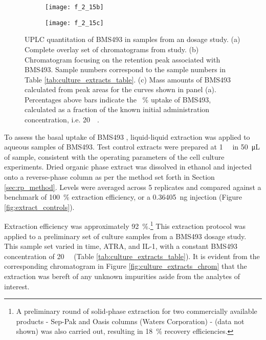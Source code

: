 \begin{refsection}
\begin{figure}[h!]
    \begin{subfigure}[b]{0.45\textwidth}
        \texttt{[image: f\_2\_15b]}
        \caption{}
        \label{fig:culture_extracts_chrom_zoom}
    \end{subfigure}
    \begin{subfigure}[b]{0.5\textwidth}
        \texttt{[image: f\_2\_15c]}
        \caption{}
        \label{fig:culture_extracts_chart}
    \end{subfigure}
    \caption[UPLC quantitation of BMS493 in samples from an 
    dosage study]{UPLC quantitation of BMS493 in samples from an  dosage study. (a) Complete overlay set of chromatograms from study.
    (b) Chromatogram focusing on the retention peak associated with BMS493.
    Sample numbers correspond to the sample numbers in Table
    \ref{tab:culture_extracts_table}. (c) Mass amounts of BMS493 calculated from peak
    areas for the curves shown in panel (a). Percentages above bars indicate the
    \SI{}{\percent} uptake of BMS493, calculated as a fraction of the known
    initial administration concentration, i.e. \SI{20}{\micro\moLar}.     
}\label{fig:uplc_report_culture_extracts}
\end{figure}
To assess the basal uptake of BMS493 , liquid-liquid
extraction was applied to aqueous samples of BMS493. Test control extracts were
prepared at \SI{1}{\micro\moLar} in \SI{50}{\uL} of sample, consistent with the
operating parameters of the  cell culture experiments. Dried
organic phase extract was dissolved in ethanol and injected onto a reverse-phase
column as per the method set forth in Section \ref{sec:rp_method}. Levels were
averaged across 5 replicates and compared against a benchmark of
\SI{100}{\percent} extraction efficiency, or a \SI{0.36405}{\ng} injection
(Figure \ref{fig:extract_controls}).

Extraction efficiency was approximately \SI{92}{\percent}.\footnote{A
    preliminary round of solid-phase extraction for two commercially available
    products - Sep-Pak  and Oasis columns (Waters Corporation) - (data
    not shown) was also carried out, resulting in \SI{18}{\percent} recovery
efficiencies.}
This extraction protocol was applied to a preliminary set of culture samples
from a BMS493 dosage study. This sample set varied in time, ATRA, and IL-1, with
a constant BMS493 concentration of \SI{20}{\micro\moLar} (Table
\ref{tab:culture_extracts_table}). It is evident from the corresponding
chromatogram in Figure \ref{fig:culture_extracts_chrom} that the extraction was
bereft of any unknown impurities aside from the analytes of interest. 


\end{refsection}
